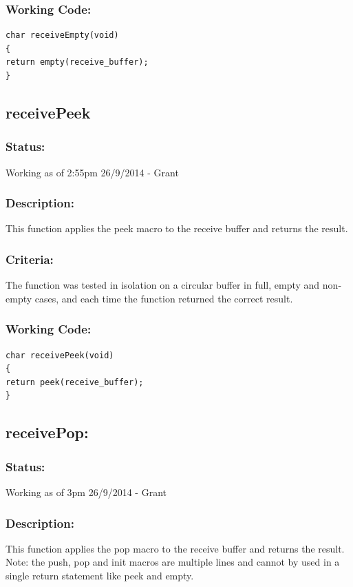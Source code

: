 \documentclass[]{report}
\begin{document}
\subsubsection{Working Code:}
\begin{lstlisting}
char receiveEmpty(void)
{
return empty(receive_buffer);
}
\end{lstlisting}


\subsection{receivePeek}
\subsubsection{Status:}
Working as of 2:55pm 26/9/2014 - Grant

\subsubsection{Description:}
This function applies the peek macro to the receive buffer and returns the result.

\subsubsection{Criteria:}
The function was tested in isolation on a circular buffer in full, empty and non-empty cases, and each time the function returned the correct result.

\subsubsection{Working Code:}
\begin{lstlisting}
char receivePeek(void)
{
return peek(receive_buffer);
}
\end{lstlisting}

\subsection{receivePop:}
\subsubsection{Status:}
Working as of 3pm 26/9/2014 - Grant

\subsubsection{Description:}
This function applies the pop macro to the receive buffer and returns the result. Note: the push, pop and init macros are multiple lines and cannot by used in a single return statement like peek and empty.
\end{document}
